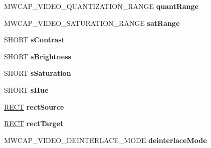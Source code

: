 \begin{DoxyCompactItemize}
\item 
\hypertarget{struct__MWCAP__VIDEO__CAPTURE__FRAME_a68b433ec6b5089c1a94d537e0e6db94c}{M\-W\-C\-A\-P\-\_\-\-V\-I\-D\-E\-O\-\_\-\-Q\-U\-A\-N\-T\-I\-Z\-A\-T\-I\-O\-N\-\_\-\-R\-A\-N\-G\-E {\bfseries quant\-Range}}\label{struct__MWCAP__VIDEO__CAPTURE__FRAME_a68b433ec6b5089c1a94d537e0e6db94c}

\item 
\hypertarget{struct__MWCAP__VIDEO__CAPTURE__FRAME_a60ec03979aa945559bb6bf9d37934a01}{M\-W\-C\-A\-P\-\_\-\-V\-I\-D\-E\-O\-\_\-\-S\-A\-T\-U\-R\-A\-T\-I\-O\-N\-\_\-\-R\-A\-N\-G\-E {\bfseries sat\-Range}}\label{struct__MWCAP__VIDEO__CAPTURE__FRAME_a60ec03979aa945559bb6bf9d37934a01}

\item 
\hypertarget{struct__MWCAP__VIDEO__CAPTURE__FRAME_ac5f5811df6e7c0f17e487fca5009458b}{S\-H\-O\-R\-T {\bfseries s\-Contrast}}\label{struct__MWCAP__VIDEO__CAPTURE__FRAME_ac5f5811df6e7c0f17e487fca5009458b}

\item 
\hypertarget{struct__MWCAP__VIDEO__CAPTURE__FRAME_a7b3acf6a2e1584fa4e692ffce76865c7}{S\-H\-O\-R\-T {\bfseries s\-Brightness}}\label{struct__MWCAP__VIDEO__CAPTURE__FRAME_a7b3acf6a2e1584fa4e692ffce76865c7}

\item 
\hypertarget{struct__MWCAP__VIDEO__CAPTURE__FRAME_abb75b42e35573de7783c2861a82093f1}{S\-H\-O\-R\-T {\bfseries s\-Saturation}}\label{struct__MWCAP__VIDEO__CAPTURE__FRAME_abb75b42e35573de7783c2861a82093f1}

\item 
\hypertarget{struct__MWCAP__VIDEO__CAPTURE__FRAME_a87d3420c0f27201ef71bd7c1d730d62d}{S\-H\-O\-R\-T {\bfseries s\-Hue}}\label{struct__MWCAP__VIDEO__CAPTURE__FRAME_a87d3420c0f27201ef71bd7c1d730d62d}

\item 
\hypertarget{struct__MWCAP__VIDEO__CAPTURE__FRAME_a3933d2b0b2d01fc1582baf55b8d00821}{\hyperlink{struct__RECT}{R\-E\-C\-T} {\bfseries rect\-Source}}\label{struct__MWCAP__VIDEO__CAPTURE__FRAME_a3933d2b0b2d01fc1582baf55b8d00821}

\item 
\hypertarget{struct__MWCAP__VIDEO__CAPTURE__FRAME_aeeed6f5096469132c507f1bfdb4391f1}{\hyperlink{struct__RECT}{R\-E\-C\-T} {\bfseries rect\-Target}}\label{struct__MWCAP__VIDEO__CAPTURE__FRAME_aeeed6f5096469132c507f1bfdb4391f1}

\item 
\hypertarget{struct__MWCAP__VIDEO__CAPTURE__FRAME_a6c25f15322d792b04c52fa6bf085bd1a}{M\-W\-C\-A\-P\-\_\-\-V\-I\-D\-E\-O\-\_\-\-D\-E\-I\-N\-T\-E\-R\-L\-A\-C\-E\-\_\-\-M\-O\-D\-E {\bfseries deinterlace\-Mode}}\label{struct__MWCAP__VIDEO__CAPTURE__FRAME_a6c25f15322d792b04c52fa6bf085bd1a}


\end{DoxyCompactItemize}
